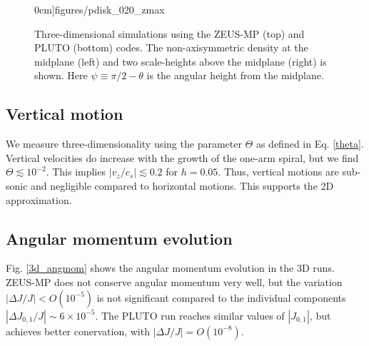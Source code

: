 \begin{figure}
\begin{center}
{      0cm]{figures/pdisk_020_zmax}
    }
  \end{center}
  \caption{Three-dimensional simulations using the ZEUS-MP (top) and 
    PLUTO (bottom) codes. The non-axisymmetric density at the midplane (left) and
    two scale-heights above the midplane (right) is shown. Here $\psi
    \equiv \pi/2 - \theta$ is the angular height  
    from the midplane.\label{3d_prelim}}   
\end{figure}

\subsection{Vertical motion}
We measure three-dimensionality using the parameter $\Theta$ as
defined in Eq. \ref{theta}.  Vertical velocities
do increase with the growth of the one-arm spiral, 
but we find  $\Theta \lesssim 10^{-2}$. This implies $|v_z/c_s|\lesssim
0.2$ for $h=0.05$. Thus, vertical motions are sub-sonic and negligible
compared to horizontal motions. This supports the 2D approximation. 

\subsection{Angular momentum evolution}

Fig. \ref{3d_angmom} shows the angular momentum evolution in the 3D
runs. ZEUS-MP does not conserve angular momentum very well, but
the variation $|\Delta J/J|< O(10^{-5})$ is not significant compared
to the individual components $|\Delta J_{0,1}/J|\sim 
6\times10^{-5}$. The PLUTO run reaches similar values of
$|J_{0,1}|$, but achieves better conervation, with $|\Delta
J/J|=O(10^{-8})$. 

